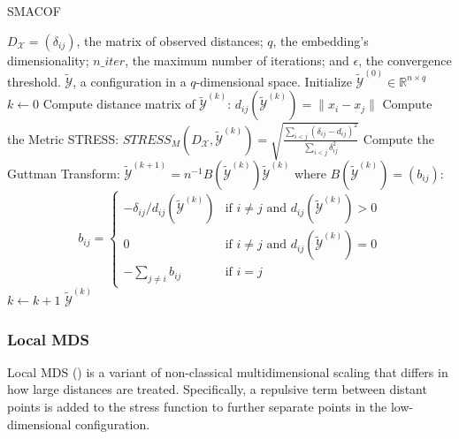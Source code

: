 \begin{algorithm}
    \caption{SMACOF}
    \label{alg:SMACOF}
    
    \begin{algorithmic}[1]
    \REQUIRE $D_{\mathcal{X}} = (\delta_{ij})$, the matrix of observed distances; $q$, the embedding's dimensionality; $n\_iter$, the maximum number of iterations; and $\epsilon$, the convergence threshold.
    \ENSURE $\tilde{\mathcal{Y}}$, a configuration in a $q$-dimensional space.
    \STATE Initialize $\tilde{\mathcal{Y}}^{(0)} \in \mathbb{R}^{n \times q}$
    \STATE $k \leftarrow 0$
    \REPEAT
        \STATE Compute distance matrix of $\tilde{\mathcal{Y}}^{(k)}$:  $d_{ij}(\tilde{\mathcal{Y}}^{(k)}) = \|x_i - x_j\|$
        \STATE Compute the Metric STRESS: $STRESS_M(D_{\mathcal{X}}, \tilde{\mathcal{Y}}^{(k)}) = \sqrt{\frac{\sum_{i<j}\left(\delta_{i j}-d_{i j}\right)^2}{\sum_{i<j} \delta_{i j}^2}}$
        \STATE Compute the Guttman Transform: $\tilde{\mathcal{Y}}^{(k+1)} = n^{-1}B(\tilde{\mathcal{Y}}^{(k)})\tilde{\mathcal{Y}}^{(k)}$ where $B(\tilde{\mathcal{Y}}^{(k)}) = (b_{ij})$:
        $$
        b_{ij} =
        \begin{cases}
        -\delta_{ij}/d_{ij}(\tilde{\mathcal{Y}}^{(k)}) & \text{if } i \neq j \text{ and } d_{ij}(\tilde{\mathcal{Y}}^{(k)}) > 0 \\
        0 & \text{if } i \neq j \text{ and } d_{ij}(\tilde{\mathcal{Y}}^{(k)}) = 0 \\
        -\sum_{j \neq i} b_{ij} & \text{if } i = j
        \end{cases}
        $$
        \STATE $k \leftarrow k + 1$
    \RETURN $\tilde{\mathcal{Y}}^{(k)}$
    \end{algorithmic}
\end{algorithm}

\subsubsection{Local MDS}

Local MDS (\cite{Chen2009}) is a variant of non-classical multidimensional scaling that differs in how large distances are treated. Specifically, a repulsive term between distant points is added to the stress function to further separate points in the low-dimensional configuration.

